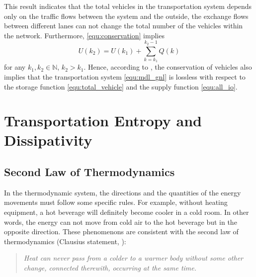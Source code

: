 \documentclass[preprint,authoryear,12pt]{elsarticle}
\begin{document}
This result indicates that the total vehicles in the transportation
system depends only on the traffic flows between the system and the
outside, the exchange flows between different lanes can not change
the total number of the vehicles within the network. Furthermore,
\eqref{equ:conservation} implies
\begin{equation}\label{equ:conservation_ex}
U(k_2) = U(k_1)+\sum_{k=k_1}^{k_2-1}Q(k)
\end{equation}
for any $k_1,k_2\in\mathbb{N}$, $k_2>k_1$. Hence, according to
\citep{willems_dissipative_1972-1}, the conservation of vehicles also
implies that the transportation system \eqref{equ:mdl_gnl} is
lossless with respect to the storage function
\eqref{equ:total_vehicle} and the supply function \eqref{equ:all_io}.

\section{Transportation Entropy and Dissipativity}\label{sec:entropy}

\subsection{Second Law of Thermodynamics}

In the thermodynamic system, the directions and the quantities of the
energy movements must follow some specific rules. For example,
without heating equipment, a hot beverage will definitely become
cooler in a cold room. In other words, the energy can not move from
cold air to the hot beverage but in the opposite direction. These
phenomenons are consistent with the second law of thermodynamics
(Clausius statement, \citet{clausius_mechanical_1867}):
\begin{quotation}
\it Heat can never pass from a colder to a warmer body without some
other change, connected therewith, occurring at the same time.
\end{quotation}
\end{document}
